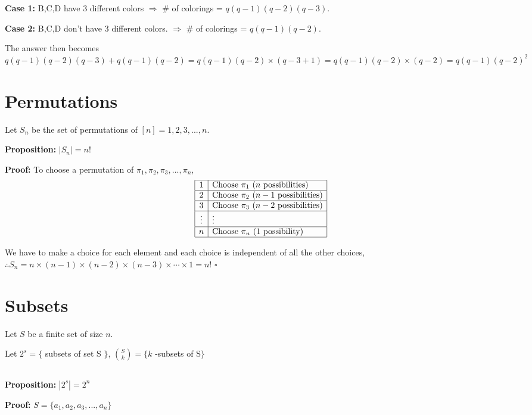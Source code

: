 \documentclass[12pt]{article}
\begin{document}
\noindent \textbf{Case 1:} B,C,D have 3 different colors \(\Rightarrow \)
\# of colorings = \(q(q-1)(q-2)(q-3)\). 

\noindent\textbf{Case 2:} B,C,D don't have 3 different colors. \(\Rightarrow \) 
\# of colorings = \(q(q-1)(q-2)\).

\noindent The answer then becomes \(q(q-1)(q-2)(q-3)+q(q-1)(q-2) 
= q(q-1)(q-2) \times (q-3 + 1) = q(q-1)(q-2) \times (q-2) = q(q-1)(q-2)^2\)

\section{Permutations}
Let \(S_n\) be the set of permutations of \([n] = {1,2,3,...,n}\).  

\noindent \textbf{Proposition:} \(|S_n| = n!\)

\noindent \textbf{Proof:} To choose a permutation of 
\(\pi_1, \pi_2, \pi_3, ..., \pi_n \),
\[
\begin{array}{|c|l|}
\hline
1 & \text{Choose } \pi_1 \text{ (} n \text{ possibilities)} \\
\hline
2 & \text{Choose } \pi_2 \text{ (} n - 1 \text{ possibilities)} \\
\hline
3 & \text{Choose } \pi_3 \text{ (} n - 2 \text{ possibilities)} \\
\hline
\vdots & \vdots \\
\hline
n & \text{Choose } \pi_n \text{ (} 1 \text{ possibility)} \\
\hline
\end{array}
\]

\noindent We have to make a choice for each element and each choice is independent 
of all the other choices, 
\(
  \therefore
  S_n = n \times (n-1) \times (n-2)
  \times (n-3) \times \cdots \times 1 
  = n!   
\)
\(\square\)

\section{Subsets}
Let $S$ be a finite set of size $n$.

\noindent Let \(2^s = \{ \) subsets of set S \(\}\), 
\(\binom{S}{k} = \{k\) -subsets of S\(\}\)

\subsection*{}
\textbf{Proposition:} 
\(|2^s| = 2^n\)

\noindent
\textbf{Proof:} \(S = \{a_1, a_2, a_3, ..., a_n\}\)
\end{document}
